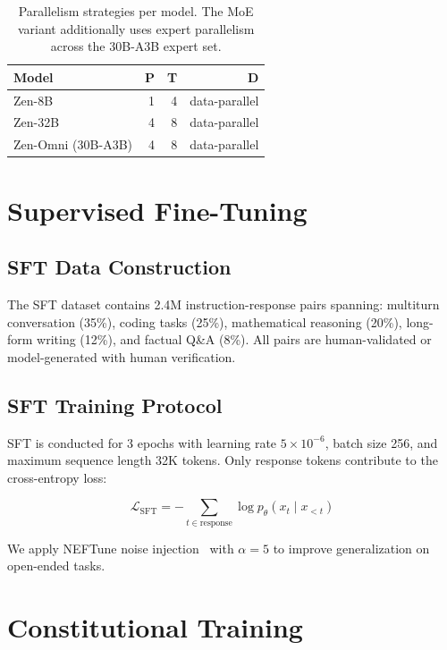 \documentclass[11pt,a4paper]{article}
\begin{document}
\begin{table}[H]
\centering
\begin{tabular}{lrrr}
\toprule
\textbf{Model} & \textbf{P} & \textbf{T} & \textbf{D} \\
\midrule
Zen-8B           & 1 & 4 & data-parallel \\
Zen-32B          & 4 & 8 & data-parallel \\
Zen-Omni (30B-A3B) & 4 & 8 & data-parallel \\
\bottomrule
\end{tabular}
\caption{Parallelism strategies per model. The MoE variant additionally uses expert
parallelism across the 30B-A3B expert set.}
\end{table}

\section{Supervised Fine-Tuning}

\subsection{SFT Data Construction}

The SFT dataset contains 2.4M instruction-response pairs spanning:
multiturn conversation (35\%), coding tasks (25\%), mathematical reasoning (20\%),
long-form writing (12\%), and factual Q\&A (8\%). All pairs are human-validated
or model-generated with human verification.

\subsection{SFT Training Protocol}

SFT is conducted for 3 epochs with learning rate $5\times10^{-6}$, batch size 256,
and maximum sequence length 32K tokens. Only response tokens contribute to the
cross-entropy loss:

\begin{equation}
\mathcal{L}_\text{SFT} = -\sum_{t \in \text{response}} \log p_\theta(x_t \mid x_{<t})
\end{equation}

We apply NEFTune noise injection~\cite{jain2023neftune} with $\alpha=5$ to improve
generalization on open-ended tasks.

\section{Constitutional Training}
\end{document}
